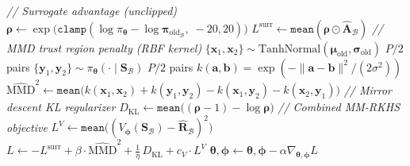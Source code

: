 \documentclass[11pt]{article}
\begin{document}
\begin{algorithm}[p]
\begin{minipage}[t]{0.68\linewidth}
\begin{algorithmic}[1]
            \Statex \hspace{\algorithmicindent}\hspace{\algorithmicindent}\hspace{\algorithmicindent}\textit{// Surrogate advantage (unclipped)}
            \State $\boldsymbol{\rho} \gets \exp\!\big(\texttt{clamp}(\log\pi_{\boldsymbol{\theta}} - \log\boldsymbol{\pi}_{\text{old}_\mathcal{B}},\; {-}20, 20)\big)$
            \State $L^{\text{surr}} \gets \texttt{mean}(\boldsymbol{\rho} \odot \hat{\mathbf{A}}_\mathcal{B})$
            \Statex \hspace{\algorithmicindent}\hspace{\algorithmicindent}\hspace{\algorithmicindent}\textit{// MMD trust region penalty (RBF kernel)}
            \State $\{\mathbf{x}_1, \mathbf{x}_2\} \sim \text{TanhNormal}(\boldsymbol{\mu}_{\text{old}}, \boldsymbol{\sigma}_{\text{old}})$ \hfill $P/2$ pairs
            \State $\{\mathbf{y}_1, \mathbf{y}_2\} \sim \pi_{\boldsymbol{\theta}}(\cdot \mid \mathbf{S}_\mathcal{B})$ \hfill $P/2$ pairs
            \State $k(\mathbf{a}, \mathbf{b}) = \exp(-\|\mathbf{a} - \mathbf{b}\|^2 / (2\sigma^2))$
            \State $\widehat{\text{MMD}}^2 \!\gets\! \texttt{mean}\!\big(k(\mathbf{x}_1, \mathbf{x}_2) + k(\mathbf{y}_1, \mathbf{y}_2) - k(\mathbf{x}_1, \mathbf{y}_2) - k(\mathbf{x}_2, \mathbf{y}_1)\big)$
            \Statex \hspace{\algorithmicindent}\hspace{\algorithmicindent}\hspace{\algorithmicindent}\textit{// Mirror descent KL regularizer}
            \State $D_{\text{KL}} \gets \texttt{mean}\!\big((\boldsymbol{\rho} - 1) - \log\boldsymbol{\rho}\big)$
            \Statex \hspace{\algorithmicindent}\hspace{\algorithmicindent}\hspace{\algorithmicindent}\textit{// Combined MM-RKHS objective}
            \State $L^V \gets \texttt{mean}\!\big((V_{\boldsymbol{\phi}}(\mathbf{S}_\mathcal{B}) - \hat{\mathbf{R}}_\mathcal{B})^2\big)$
            \State $L \gets -L^{\text{surr}} + \beta \cdot \widehat{\text{MMD}}^2 + \tfrac{1}{\eta}\, D_{\text{KL}} + c_V \cdot L^V$
            \State $\boldsymbol{\theta}, \boldsymbol{\phi} \gets \boldsymbol{\theta}, \boldsymbol{\phi} - \alpha \nabla_{\boldsymbol{\theta}, \boldsymbol{\phi}} L$
        \EndFor
    \EndFor
\EndFor
\end{algorithmic}
\end{minipage}
\end{algorithm}
\end{document}
